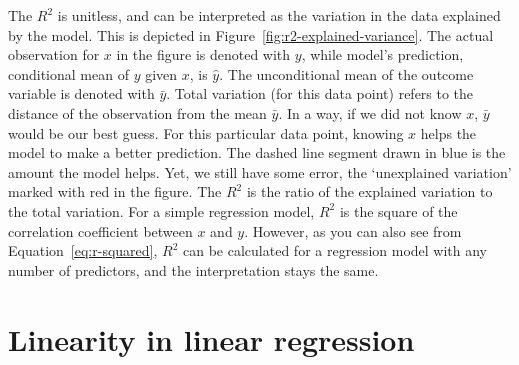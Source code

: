 The $R^{2}$ is unitless,
and can be interpreted as the variation in the data explained by the model.
This is depicted in Figure~\ref{fig:r2-explained-variance}.
The actual observation for $x$ in the figure is denoted with $y$,
while model's prediction, conditional mean of $y$ given $x$, is $\hat{y}$.
The unconditional mean of the outcome variable is denoted with $\bar{y}$.
Total variation (for this data point) refers to the distance of the
observation from the mean $\bar{y}$.
In a way, if we did not know $x$, $\bar{y}$ would be our best guess.
For this particular data point,
knowing $x$ helps the model to make a better prediction.
The dashed line segment drawn in blue is the amount the model helps.
Yet, we still have some error, the `unexplained variation'
marked with red in the figure.
The $R^{2}$ is the ratio of the explained variation to the total variation.
For a simple regression model, $R^{2}$ is
the square of the correlation coefficient between $x$ and $y$.
However, as you can also see from Equation~\ref{eq:r-squared},
$R^{2}$ can be calculated for a regression model
with any number of predictors,
and the interpretation stays the same.


\section{Linearity in linear regression}

